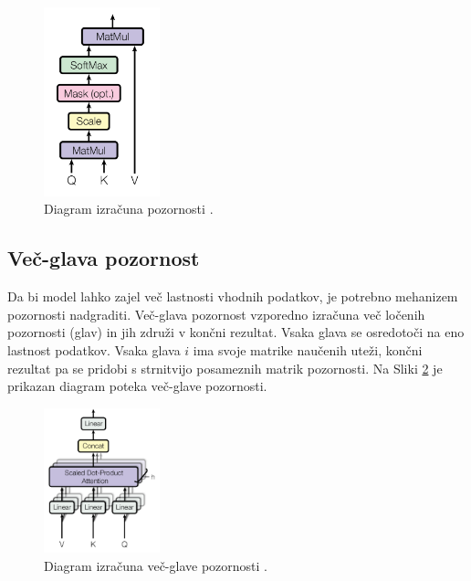 \documentclass[a4paper,12pt,openright]{book}
\begin{document}
\begin{figure}[htb]
    \begin{center}
        \includegraphics[width=0.3\textwidth]{img/attention.png}
    \end{center}
    \caption{Diagram izračuna pozornosti \cite{attention_is_all_you_need}.}
    \label{img:attention}
\end{figure}


\subsection{Več-glava pozornost}
Da bi model lahko zajel več lastnosti vhodnih podatkov, je potrebno mehanizem pozornosti nadgraditi. Več-glava pozornost vzporedno izračuna več ločenih pozornosti (glav) in jih združi v končni rezultat. Vsaka glava se osredotoči na eno lastnost podatkov. Vsaka glava $ i $ ima svoje matrike naučenih uteži, končni rezultat pa se pridobi s strnitvijo posameznih matrik pozornosti. Na Sliki \ref{img:mha} je prikazan diagram poteka več-glave pozornosti.

\begin{figure}[htb]
    \begin{center}
        \includegraphics[width=0.3\textwidth]{img/mha.png}
    \end{center}
    \caption{Diagram izračuna več-glave pozornosti \cite{attention_is_all_you_need}.}
    \label{img:mha}
\end{figure}
\end{document}
